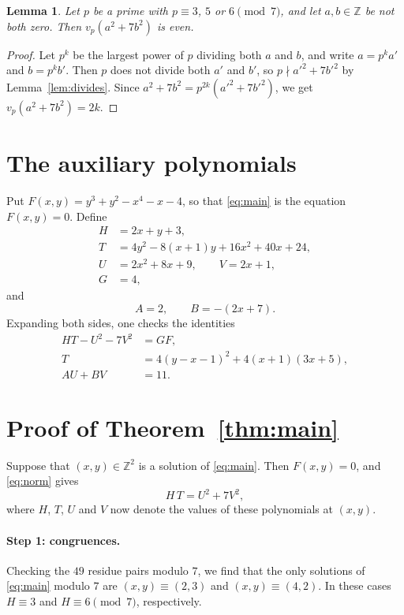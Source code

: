 \documentclass[11pt]{article}
\newtheorem{lemma}[theorem]{Lemma}
\newcommand{\Z}{\mathbb{Z}}
\begin{document}
\begin{lemma}\label{lem:even}
Let $p$ be a prime with $p\equiv3$, $5$ or $6\pmod7$, and let $a,b\in\Z$ be not both zero. Then $v_p(a^2+7b^2)$ is even.
\end{lemma}

\begin{proof}
Let $p^k$ be the largest power of $p$ dividing both $a$ and $b$, and write $a=p^ka'$ and $b=p^kb'$. Then $p$ does not divide both $a'$ and $b'$, so $p\nmid a'^2+7b'^2$ by Lemma~\ref{lem:divides}. Since $a^2+7b^2=p^{2k}(a'^2+7b'^2)$, we get $v_p(a^2+7b^2)=2k$.
\end{proof}

\section{The auxiliary polynomials}

Put $F(x,y)=y^3+y^2-x^4-x-4$, so that \eqref{eq:main} is the equation $F(x,y)=0$. Define
\begin{align*}
H&=2x+y+3,\\
T&=4y^2-8(x+1)y+16x^2+40x+24,\\
U&=2x^2+8x+9,\qquad V=2x+1,\\
G&=4,
\end{align*}
and
\[
A=2,\qquad B=-(2x+7).
\]
Expanding both sides, one checks the identities
\begin{align}
HT-U^2-7V^2&=GF,\label{eq:norm}\\
T&=4(y-x-1)^2+4(x+1)(3x+5),\label{eq:sign}\\
AU+BV&=11.\label{eq:bezout}
\end{align}

\section{Proof of Theorem~\ref{thm:main}}

Suppose that $(x,y)\in\Z^2$ is a solution of \eqref{eq:main}. Then $F(x,y)=0$, and \eqref{eq:norm} gives
\begin{equation}\label{eq:HT}
H\,T=U^2+7V^2,
\end{equation}
where $H$, $T$, $U$ and $V$ now denote the values of these polynomials at $(x,y)$.

\paragraph{Step 1: congruences.} Checking the $49$ residue pairs modulo $7$, we find that the only solutions of \eqref{eq:main} modulo $7$ are $(x,y)\equiv(2,3)$ and $(x,y)\equiv(4,2)$. In these cases $H\equiv3$ and $H\equiv6\pmod7$, respectively.
\end{document}
